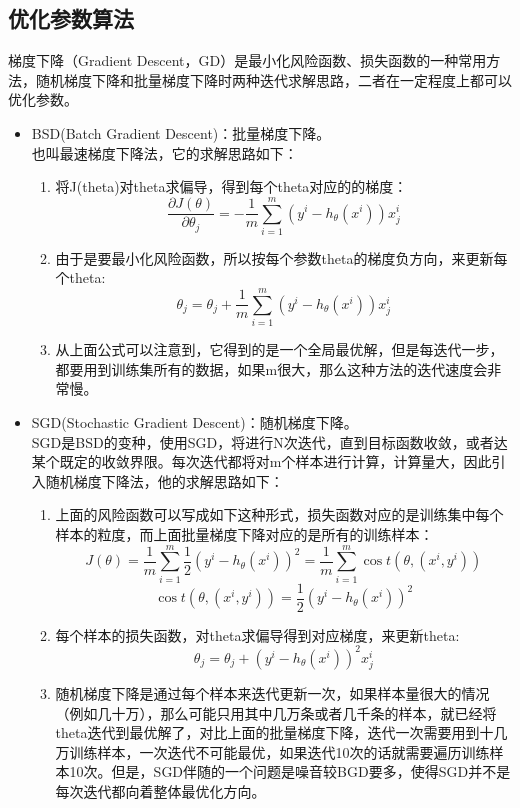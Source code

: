 \subsection{优化参数算法}
梯度下降（Gradient Descent，GD）是最小化风险函数、损失函数的一种常用方法，随机梯度下降和批量梯度下降时两种迭代求解思路，二者在一定程度上都可以优化参数。
\begin{itemize}
\item BSD(Batch Gradient Descent)：批量梯度下降。~\\
也叫最速梯度下降法，它的求解思路如下：\\
\begin{enumerate}
\item 将J(theta)对theta求偏导，得到每个theta对应的的梯度：
\begin{displaymath}
\frac{\partial J(\theta)}{\partial {\theta_j}} =-\frac{1}{m}\sum_{i=1}^m(y^i-h_{\theta}(x^i))x^i_j
\end{displaymath}
\item 由于是要最小化风险函数，所以按每个参数theta的梯度负方向，来更新每个theta:
\begin{displaymath}
\theta_j=\theta_j+\frac{1}{m}\sum_{i=1}^m(y^i-h_{\theta}(x^i))x^i_j
\end{displaymath}
\item 从上面公式可以注意到，它得到的是一个全局最优解，但是每迭代一步，都要用到训练集所有的数据，如果m很大，那么这种方法的迭代速度会非常慢。
\end{enumerate}
\item SGD(Stochastic Gradient Descent)：随机梯度下降。~\\
SGD是BSD的变种，使用SGD，将进行N次迭代，直到目标函数收敛，或者达某个既定的收敛界限。每次迭代都将对m个样本进行计算，计算量大，因此引入随机梯度下降法，他的求解思路如下：\\
\begin{enumerate}
\item 上面的风险函数可以写成如下这种形式，损失函数对应的是训练集中每个样本的粒度，而上面批量梯度下降对应的是所有的训练样本：
\begin{displaymath}
J(\theta)=\frac{1}{m}\sum_{i=1}^{m}\frac{1}{2}(y^i-h_{\theta}(x^i))^2=\frac{1}{m}\sum_{i=1}^{m}\cos t(\theta,(x^i,y^i))
\end{displaymath}
\begin{displaymath}
\cos t(\theta,(x^i,y^i))=\frac{1}{2}(y^i-h_{\theta}(x^i))^2
\end{displaymath}
\item 每个样本的损失函数，对theta求偏导得到对应梯度，来更新theta:
\begin{displaymath}
\theta_j=\theta_j+(y^i-h_{\theta}(x^i))^2{x^i_j}
\end{displaymath}
\item 随机梯度下降是通过每个样本来迭代更新一次，如果样本量很大的情况（例如几十万），那么可能只用其中几万条或者几千条的样本，就已经将theta迭代到最优解了，对比上面的批量梯度下降，迭代一次需要用到十几万训练样本，一次迭代不可能最优，如果迭代10次的话就需要遍历训练样本10次。但是，SGD伴随的一个问题是噪音较BGD要多，使得SGD并不是每次迭代都向着整体最优化方向。
\end{enumerate}
\end{itemize}

